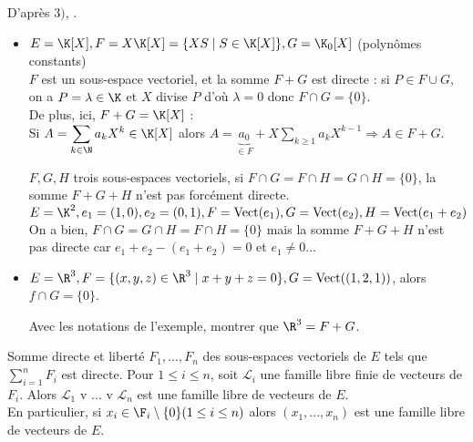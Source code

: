 \documentclass[12pt, a4paper]{report}
\begin{document}
\begin{remarque}{}
D'après $3)$, .
\end{remarque}

\begin{exemple}{}
\begin{itemize}
	\item $E=\K[X], F=X\K[X] = \{ XS \mid S \in \K[X] \}, G = \K_0[X]$ (polynômes constants) \\
	$F$ est un sous-espace vectoriel, et la somme $F+G$ est directe : si $P \in F \cup G$, on a $P = \lambda \in \K$ et $X$ divise $P$ d'où $\lambda = 0$ donc $F \cap G = \{ 0 \}$. \\
	De plus, ici, $F+G = \K[X]$ : \\
	Si $A = \displaystyle{\sum_{k \in \N} a_kX^k} \in \K[X]$ alors $A = \underbrace{a_0}_{\in F} + X \displaystyle{\sum_{k \ge 1}a_kX^{k-1}} \Longrightarrow A \in F + G$.
	
	\begin{remarque}[Attention !]{}
	$F,G,H$ trois sous-espaces vectoriels, si $F \cap G = F \cap H = G \cap H = \{ 0 \}$, la somme $F+G+H$ n'est pas forcément directe. \\
	$E = \K^2, e_1 = (1,0), e_2 = (0,1), F = \text{Vect}(e_1), G = \text{Vect}(e_2), H = \text{Vect}(e_1+e_2)$ \\
	On a bien, $F \cap G = G \cap H = F \cap H = \{0\}$ mais la somme $F+G+H$ n'est pas directe car $e_1+e_2-(e_1+e_2) = 0$ et $e_1 \ne 0$...
	\end{remarque}
	
	\item $E=\R^3, F = \{(x,y,z) \in \R^3 \mid x+y+z = 0 \}, G = \text{Vect}((1,2,1))$, alors $f \cap G = \{0\}$.
	
	\begin{exemple}[Exercice]{}
	Avec les notations de l'exemple, montrer que $\R^3 = F+G$.
	\end{exemple}
\end{itemize}
\end{exemple}

\begin{proposition}{Somme directe et liberté}{}
$F_1,...,F_n$ des sous-espaces vectoriels de $E$ tels que $\displaystyle{\sum_{i=1}^nF_i}$ est directe. Pour $1 \le i \le n$, soit $\mathcal{L}_i$ une famille libre finie de vecteurs de $F_i$. Alors $\mathcal{L}_1 \text{ v }...\text{ v } \mathcal{L}_n$ est une famille libre de vecteurs de $E$. \\
En particulier, si $x_i \in \F_i \setminus \{0\} (1 \le i \le n)$ alors $(x_1,...,x_n)$ est une famille libre de vecteurs de $E$.
\end{proposition}
\end{document}
